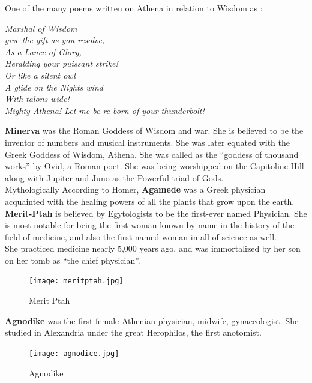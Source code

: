 \documentclass[a4paper,10pt]{article}
\begin{document}
One of the many poems written on Athena in relation to Wisdom as \cite{athena}:\\
\begin{center}
\textit{Marshal of Wisdom}\\
\textit{give the gift as you resolve,}\\
\textit{As a Lance of Glory,}\\
\textit{Heralding your puissant strike!}\\
\textit{Or like a silent owl}\\
\textit{A glide on the Nights wind}\\
\textit{With talons wide!}\\
\textit{Mighty Athena! Let me be re-born of your thunderbolt!}\\
\end{center}

\newblock
\textbf{Minerva} was the Roman Goddess of Wisdom and war. She is believed to be the inventor of numbers and musical instruments. She was later equated with the Greek Goddess of Wisdom, Athena. She was called as the “goddess of thousand works” by Ovid, a Roman poet. She was being worshipped on the Capitoline Hill along with Jupiter and Juno as the Powerful triad of Gods.\\

\newblock
Mythologically According to Homer, \textbf{Agamede} was a Greek physician acquainted with the healing powers of all the plants that grow upon the earth.\\

\newblock
\textbf{Merit-Ptah} is believed by Egytologists to be the first-ever named Physician. She is most notable for being the first woman known by name in the history of the field of medicine, and also the first named woman in all of science as well.\\
She practiced medicine nearly 5,000 years ago, and was immortalized by her son on her tomb as “the chief physician”\cite{merit}.
\begin{center}
\begin{figure}[h]
\centering
 \texttt{[image: meritptah.jpg]}
 \caption{Merit Ptah}
\end{figure}
\end{center}

\newblock
\textbf{Agnodike} was the first female Athenian physician, midwife, gynaecologist. She studied in Alexandria under the great Herophilos, the first anotomist.

\begin{center}
\begin{figure}[h]
\centering
 \texttt{[image: agnodice.jpg]}
 \caption{Agnodike}
\end{figure}
\end{center}
\end{document}
